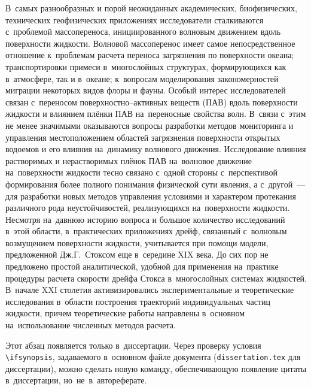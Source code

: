 
{\actuality} В~самых разнообразных и порой неожиданных академических, биофизических, технических геофизических приложениях исследователи сталкиваются с~проблемой массопереноса, инициированного волновым движением вдоль поверхности жидкости. Волновой массоперенос имеет самое непосредственное отношение к~проблемам расчета переноса загрязнения по поверхности океана; транспортировки примеси в~многослойных структурах, формирующихся как в~атмосфере, так и в~океане; к~вопросам моделирования закономерностей миграции некоторых видов флоры и фауны. Особый интерес исследователей связан с~переносом поверхностно--активных веществ (ПАВ) вдоль поверхности жидкости и влиянием плёнки ПАВ на~переносные свойства волн. В~связи с~этим не менее значимыми оказываются вопросы разработки методов мониторинга и управления местоположением областей загрязнения поверхности открытых водоемов и его влияния на~динамику волнового движения. Исследование влияния растворимых и нерастворимых плёнок ПАВ на~волновое движение на~поверхности жидкости тесно связано с~одной стороны с~перспективой формирования более полного понимания физической сути явления, а с~другой~--- для разработки новых методов управления условиями и характером протекания различного рода неустойчивостей, реализующихся на~поверхности жидкости.
 Несмотря на~давнюю историю вопроса и большое количество исследований в~этой области, в~практических приложениях дрейф, связанный с~волновым возмущением поверхности жидкости, учитывается при помощи модели, предложенной Дж.Г.~Стоксом еще в~середине XIX века. До сих пор не предложено простой аналитической, удобной для применения на~практике процедуры расчета скорости дрейфа Стокса в~многослойных системах жидкостей. В~начале XXI столетия активизировались экспериментальные и теоретические исследования в~области построения траекторий индивидуальных частиц жидкости, причем теоретические работы направлены в~основном на~использование численных методов расчета. 
\ifsynopsis

\else
Этот абзац появляется только в~диссертации.
Через проверку условия \verb!\!\verb!ifsynopsis!, задаваемого в~основном файле
документа (\verb!dissertation.tex! для диссертации), можно сделать новую
команду, обеспечивающую появление цитаты в~диссертации, но~не~в~автореферате.
\fi


